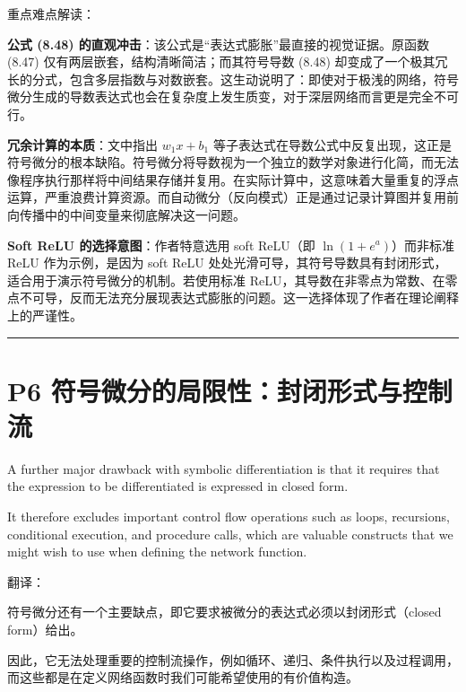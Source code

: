 \documentclass{article}
\begin{document}
{\color{blue}
重点难点解读：

\textbf{公式 (8.48) 的直观冲击}：该公式是“表达式膨胀”最直接的视觉证据。原函数 (8.47) 仅有两层嵌套，结构清晰简洁；而其符号导数 (8.48) 却变成了一个极其冗长的分式，包含多层指数与对数嵌套。这生动说明了：即使对于极浅的网络，符号微分生成的导数表达式也会在复杂度上发生质变，对于深层网络而言更是完全不可行。
    
\textbf{冗余计算的本质}：文中指出 $w_1 x + b_1$ 等子表达式在导数公式中反复出现，这正是符号微分的根本缺陷。符号微分将导数视为一个独立的数学对象进行化简，而无法像程序执行那样将中间结果存储并复用。在实际计算中，这意味着大量重复的浮点运算，严重浪费计算资源。而自动微分（反向模式）正是通过记录计算图并复用前向传播中的中间变量来彻底解决这一问题。
    
\textbf{Soft ReLU 的选择意图}：作者特意选用 soft ReLU（即 $\ln(1+e^a)$）而非标准 ReLU 作为示例，是因为 soft ReLU 处处光滑可导，其符号导数具有封闭形式，适合用于演示符号微分的机制。若使用标准 ReLU，其导数在非零点为常数、在零点不可导，反而无法充分展现表达式膨胀的问题。这一选择体现了作者在理论阐释上的严谨性。

}

\noindent\rule{\linewidth}{0.4pt}

\section{P6 符号微分的局限性：封闭形式与控制流}

A further major drawback with symbolic differentiation is that it requires that the expression to be differentiated is expressed in closed form. 

It therefore excludes important control flow operations such as loops, recursions, conditional execution, and procedure calls, which are valuable constructs that we might wish to use when defining the network function.

{\color{red}
翻译：

符号微分还有一个主要缺点，即它要求被微分的表达式必须以封闭形式（closed form）给出。

因此，它无法处理重要的控制流操作，例如循环、递归、条件执行以及过程调用，而这些都是在定义网络函数时我们可能希望使用的有价值构造。
}
\end{document}
